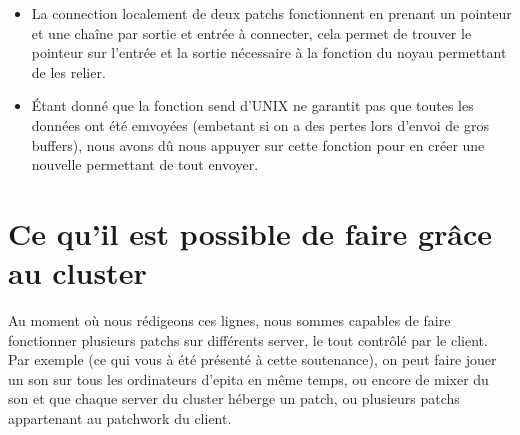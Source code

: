\begin{itemize}
le pointeur du patch. Ensuite il faut cr\'er un patch permettant le transit 
des donn\'ees entre les deux patchs puis le connecter au patch du serveur 1 
c\^ot\'e input du patch. Ce patch a donc une sortie qui renvoit n'importe 
quelle donn\'ee et qui permet de tout transiter avec les fonctions d'envoi et 
de r\'eception de grosse donn\'ees. Pour le pump tout va se faire en 
transparent, lorsque le patch pr\'ec\'edent demandera un pump du fameux patch 
alors il demandera de pumper avec un message r\'eseau au patch du serveur 2 
puis se mettra en attente des donn\'ees qui arriveront sur la sortie du path 
du serveur 2 et qui ressortiront directement sur l'output du patch de 
transmission.

  \newpage

\item La connection localement de deux patchs fonctionnent en prenant un 
pointeur et une cha\^ine par sortie et entr\'ee \`a connecter, cela permet de 
trouver le pointeur sur l'entr\'ee et la sortie n\'ecessaire \`a la fonction 
du noyau permettant de les relier. 
  \newline
\item \'Etant donn\'e que la fonction send d'UNIX ne garantit pas que toutes 
les
 donn\'ees ont \'et\'e emvoy\'ees (embetant si on a des pertes lors d'envoi de 
gros buffers), nous avons d\^u nous appuyer sur cette fonction pour en cr\'eer 
une nouvelle permettant de tout envoyer.

\end{itemize}



\section{Ce qu'il est possible de faire gr\^ace au cluster}
Au moment o\`u nous r\'edigeons ces lignes, nous sommes capables de faire 
fonctionner plusieurs patchs sur diff\'erents server, le tout contr\^ol\'e 
par le client.
Par exemple (ce qui vous \`a \'et\'e pr\'esent\'e \`a cette soutenance),
on peut faire jouer un son sur tous les ordinateurs d'epita en m\^eme temps, 
ou encore de mixer du son et que chaque server du cluster h\'eberge un patch, 
ou plusieurs patchs appartenant au patchwork du client. 

